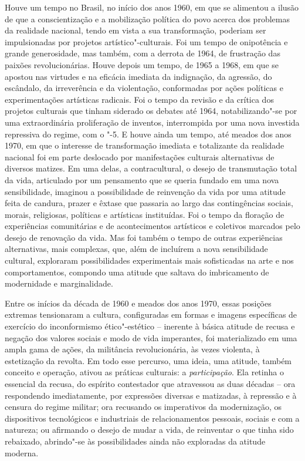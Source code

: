 Houve um tempo no Brasil, no início dos anos 1960, em que se alimentou a
ilusão de que a conscientização e a mobilização política do povo acerca
dos problemas da realidade nacional, tendo em vista a sua transformação,
poderiam ser impulsionadas por projetos artístico"-culturais. Foi um
tempo de onipotência e grande generosidade, mas também, com a derrota de
1964, de frustração das paixões revolucionárias. Houve depois um tempo,
de 1965 a 1968, em que se apostou nas virtudes e na eficácia imediata da
indignação, da agressão, do escândalo, da irreverência e da violentação,
conformadas por ações políticas e experimentações artísticas radicais.
Foi o tempo da revisão e da crítica dos projetos culturais que tinham
siderado os debates até 1964, notabilizando"-se por uma extraordinária
proliferação de inventos, interrompida por uma nova investida repressiva
do regime, com o "-5. E houve ainda um tempo, até meados dos anos 1970,
em que o interesse de transformação imediata e totalizante da realidade
nacional foi em parte deslocado por manifestações culturais alternativas
de diversos matizes. Em uma delas, a contracultural, o desejo de
transmutação total da vida, articulado por um pensamento que se queria
fundado em uma nova sensibilidade, imaginou a possibilidade de
reinvenção da vida por uma atitude feita de candura, prazer e êxtase que
passaria ao largo das contingências sociais, morais, religiosas,
políticas e artísticas instituídas. Foi o tempo da floração de
experiências comunitárias e de acontecimentos artísticos e coletivos
marcados pelo desejo de renovação da vida. Mas foi também o tempo de
outras experiências alternativas, mais complexas, que, além de incluírem
a nova sensibilidade cultural, exploraram possibilidades experimentais
mais sofisticadas na arte e nos comportamentos, compondo uma atitude que
saltava do imbricamento de modernidade e marginalidade.

Entre os inícios da década de 1960 e meados dos anos 1970, essas
posições extremas tensionaram a cultura, configuradas em formas e
imagens específicas de exercício do inconformismo ético"-estético --
inerente à básica atitude de recusa e negação dos valores sociais e modo
de vida imperantes, foi materializado em uma ampla gama de ações, da
militância revolucionária, às vezes violenta, à estetização da revolta.
Em todo esse percurso, uma ideia, uma atitude, também conceito e
operação, ativou as práticas culturais: a \emph{participação}. Ela
retinha o essencial da recusa, do espírito contestador que atravessou as
duas décadas -- ora respondendo imediatamente, por expressões diversas e
matizadas, à repressão e à censura do regime militar; ora recusando os
imperativos da modernização, os dispositivos tecnológicos e industriais
de relacionamentos pessoais, sociais e com a natureza; ou afirmando o
desejo de mudar a vida, de reinventar o que tinha sido rebaixado,
abrindo"-se às possibilidades ainda não exploradas da atitude moderna.

